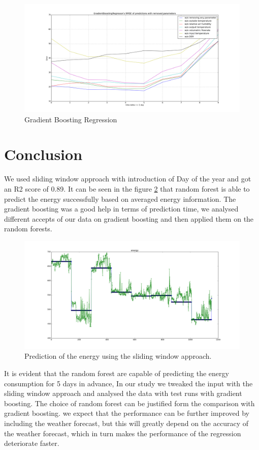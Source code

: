 \documentclass{scrartcl}
\begin{document}
\begin{figure}[H]
  \center
  \includegraphics[width=1\linewidth]{img/GradientBoostingRegressor_day_error_without_some_params.png}
  \caption{Gradient Boosting Regression}
  \label{fig:GradientBoostingRegressor_day_error_without_some_params}
\end{figure}
\newpage
\section{Conclusion}
\label{sec:conclusion}
We used sliding window approach with introduction of Day of the year and got an R2 score of 0.89. It can be seen in the figure \ref{fig:predict-energy} that random forest is able to predict the energy successfully based on averaged energy information.
The gradient boosting was a good help in terms of prediction time, we analysed different accepts of our data on gradient boosting and then applied them on the random forests.
\begin{figure}[H]
  \includegraphics[width=0.8\linewidth]{img/predict-energy--0p890.png}
  \caption{Prediction of the energy using the sliding window approach.}
  \label{fig:predict-energy}
\end{figure}
It is evident that the random forest are capable of predicting the energy consumption for 5 days in advance, In our study we tweaked the input with the sliding window approach and analysed the data with test runs with gradient boosting. The choice of random forest can be justified form the comparison with gradient boosting. we expect that the performance can be further improved by including the weather forecast, but this will greatly depend on the accuracy of the weather forecast, which in turn makes the performance of the regression deteriorate faster.
\end{document}
